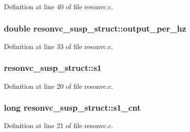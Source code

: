 Definition at line 40 of file resonvc.\+c.

\subsubsection[{\texorpdfstring{output\+\_\+per\+\_\+hz}{output_per_hz}}]{\setlength{\rightskip}{0pt plus 5cm}double resonvc\+\_\+susp\+\_\+struct\+::output\+\_\+per\+\_\+hz}\hypertarget{structresonvc__susp__struct_ae2045e154fc83faf5ff4b357a68f38e2}{}\label{structresonvc__susp__struct_ae2045e154fc83faf5ff4b357a68f38e2}


Definition at line 33 of file resonvc.\+c.

\subsubsection[{\texorpdfstring{s1}{s1}}]{ resonvc\+\_\+susp\+\_\+struct\+::s1}\hypertarget{structresonvc__susp__struct_a07d41f1406bdcec95f4104f77112271f}{}\label{structresonvc__susp__struct_a07d41f1406bdcec95f4104f77112271f}


Definition at line 20 of file resonvc.\+c.

\subsubsection[{\texorpdfstring{s1\+\_\+cnt}{s1_cnt}}]{\setlength{\rightskip}{0pt plus 5cm}long resonvc\+\_\+susp\+\_\+struct\+::s1\+\_\+cnt}\hypertarget{structresonvc__susp__struct_ab55cd970829e5cfd119fe4ec702fb9c6}{}\label{structresonvc__susp__struct_ab55cd970829e5cfd119fe4ec702fb9c6}


Definition at line 21 of file resonvc.\+c.

